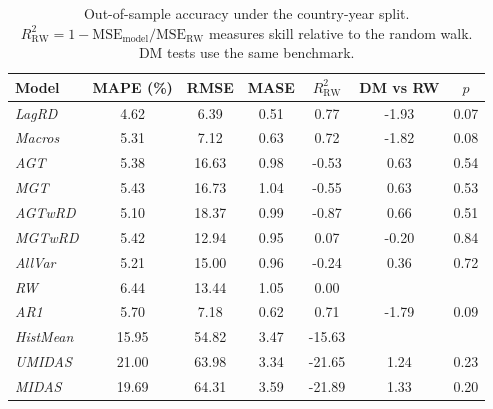 \begin{table}[!htb]
\centering
\caption{Out-of-sample accuracy under the country-year split. $R^2_{\mathrm{RW}}=1-\mathrm{MSE}_{\mathrm{model}}/\mathrm{MSE}_{\mathrm{RW}}$ measures skill relative to the random walk. DM tests use the same benchmark.}
\label{tab:cy_benchmarks}
\begin{tabular}{l c c c c c c}
\toprule
Model & MAPE (\%) & RMSE & MASE & $R^2_{\mathrm{RW}}$ & DM vs RW & $p$ \\
\midrule
\textit{LagRD} & 4.62 & 6.39 & 0.51 & 0.77 & -1.93 & 0.07 \\
\textit{Macros} & 5.31 & 7.12 & 0.63 & 0.72 & -1.82 & 0.08 \\
\textit{AGT} & 5.38 & 16.63 & 0.98 & -0.53 & 0.63 & 0.54 \\
\textit{MGT} & 5.43 & 16.73 & 1.04 & -0.55 & 0.63 & 0.53 \\
\textit{AGTwRD} & 5.10 & 18.37 & 0.99 & -0.87 & 0.66 & 0.51 \\
\textit{MGTwRD} & 5.42 & 12.94 & 0.95 & 0.07 & -0.20 & 0.84 \\
\textit{AllVar} & 5.21 & 15.00 & 0.96 & -0.24 & 0.36 & 0.72 \\
\midrule
\textit{RW} & 6.44 & 13.44 & 1.05 & 0.00 &  &  \\
\textit{AR1} & 5.70 & 7.18 & 0.62 & 0.71 & -1.79 & 0.09 \\
\textit{HistMean} & 15.95 & 54.82 & 3.47 & -15.63 &  &  \\
\textit{UMIDAS} & 21.00 & 63.98 & 3.34 & -21.65 & 1.24 & 0.23 \\
\textit{MIDAS} & 19.69 & 64.31 & 3.59 & -21.89 & 1.33 & 0.20 \\
\bottomrule
\end{tabular}
\end{table}
